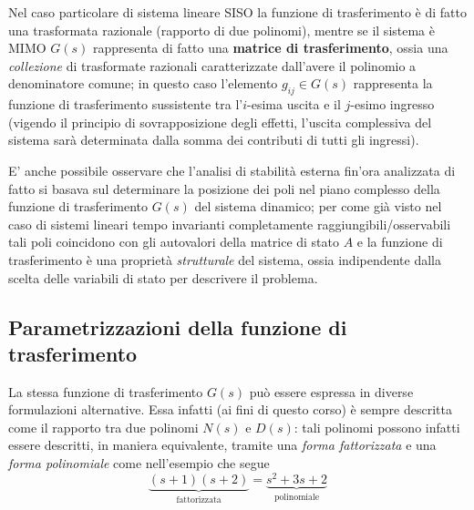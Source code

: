 	Nel caso particolare di sistema lineare SISO la funzione di trasferimento è di fatto una trasformata razionale (rapporto di due polinomi), mentre se il sistema è MIMO $G(s)$ rappresenta di fatto una \textbf{matrice di trasferimento}, ossia una \textit{collezione} di trasformate razionali caratterizzate dall'avere il polinomio a denominatore comune; in questo caso l'elemento $g_{ij} \in G(s)$ rappresenta la funzione di trasferimento sussistente tra l'$i$-esima uscita e il $j$-esimo ingresso (vigendo il principio di sovrapposizione degli effetti, l'uscita complessiva del sistema sarà determinata dalla somma dei contributi di tutti gli ingressi).
	
	\vspace{3mm} E' anche possibile osservare che l'analisi di stabilità esterna fin'ora analizzata di fatto si basava sul determinare la posizione dei poli nel piano complesso della funzione di trasferimento $G(s)$ del sistema dinamico; per come già visto nel caso di sistemi lineari tempo invarianti completamente raggiungibili/osservabili tali poli coincidono con gli autovalori della matrice di stato $A$ e la funzione di trasferimento è una proprietà \textit{strutturale} del sistema, ossia indipendente dalla scelta delle variabili di stato per descrivere il problema.
	
	\subsection{Parametrizzazioni della funzione di trasferimento}
		La stessa funzione di trasferimento $G(s)$ può essere espressa in diverse formulazioni alternative. Essa infatti (ai fini di questo corso) è sempre descritta come il rapporto tra due polinomi $N(s)$ e $D(s)$: tali polinomi possono infatti essere descritti, in maniera equivalente, tramite una \textit{forma fattorizzata} e una \textit{forma polinomiale} come nell'esempio che segue
		\[ \underbrace{(s+1)(s+2)}_\textrm{fattorizzata} = \underbrace{s^2+3s + 2}_\textrm{polinomiale} \]
	
